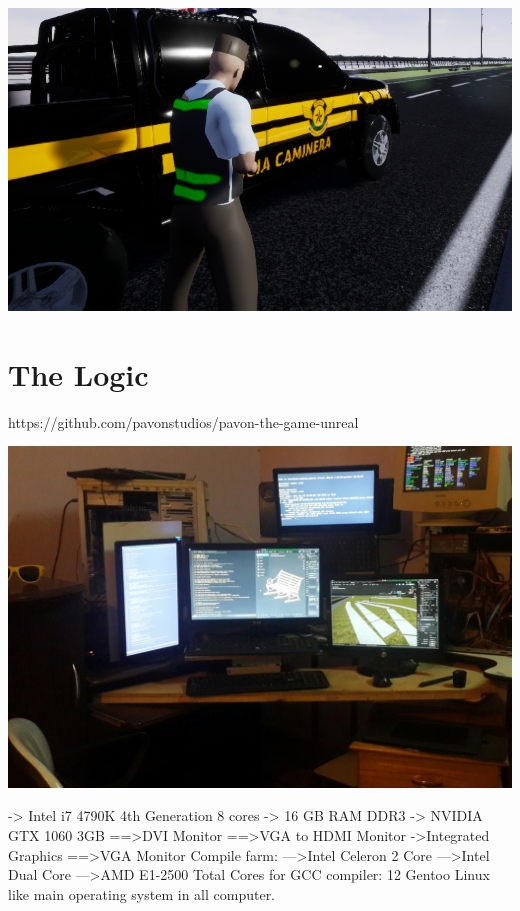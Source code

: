 \documentclass{article}
\begin{document}
  \includegraphics[width=\textwidth]{87.png}

  \section{The Logic}

  https://github.com/pavonstudios/pavon-the-game-unreal

  \includegraphics[width=\textwidth]{46.jpg}

  -> Intel i7 4790K 4th Generation 8 cores
-> 16 GB RAM DDR3
-> NVIDIA GTX 1060 3GB
==>DVI Monitor
==>VGA to HDMI Monitor
->Integrated Graphics
==>VGA Monitor
Compile farm:
--->Intel Celeron 2 Core
--->Intel Dual Core
--->AMD E1-2500
Total Cores for GCC compiler: 12
Gentoo Linux like main operating system in all computer.
\end{document}

